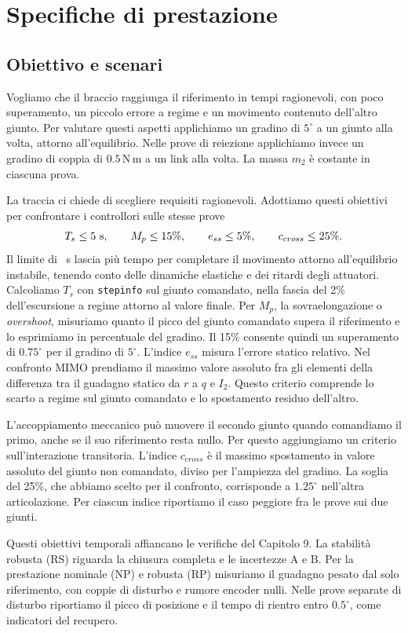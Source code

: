 \chapter{Specifiche di prestazione}
\section{Obiettivo e scenari}
Vogliamo che il braccio raggiunga il riferimento in tempi ragionevoli,
con poco superamento, un piccolo errore a regime e un movimento
contenuto dell'altro giunto. Per valutare questi aspetti applichiamo
un gradino di $5^\circ$ a un giunto alla volta, attorno all'equilibrio.
Nelle prove di reiezione applichiamo invece un gradino di coppia di
$0.5\,\mathrm{N\,m}$ a un link alla volta. La massa $m_2$ è costante
in ciascuna prova.

La traccia ci chiede di scegliere requisiti ragionevoli. Adottiamo
questi obiettivi per confrontare i controllori sulle stesse prove
\[
 T_s\leq5\ \mathrm{s},\qquad M_p\leq15\%,\qquad
 e_{ss}\leq5\%,\qquad c_{cross}\leq25\%.
\]
Il limite di \FinTsLimit\ s lascia più tempo per completare il
movimento attorno all'equilibrio instabile, tenendo conto delle
dinamiche elastiche e dei ritardi degli attuatori. Calcoliamo $T_s$ con \texttt{stepinfo} sul
giunto comandato, nella fascia del 2\% dell'escursione a regime attorno
al valore finale. Per $M_p$, la sovraelongazione o \emph{overshoot},
misuriamo quanto il picco del giunto comandato supera il riferimento
e lo esprimiamo in percentuale del gradino. Il 15\% consente quindi
un superamento di $0.75^\circ$ per il gradino di $5^\circ$.
L'indice $e_{ss}$ misura l'errore statico relativo. Nel confronto MIMO
prendiamo il massimo valore assoluto fra gli elementi della differenza
tra il guadagno statico da $r$ a $q$ e $I_2$. Questo criterio comprende
lo scarto a regime sul giunto comandato e lo spostamento residuo
dell'altro.

L'accoppiamento meccanico può muovere il secondo giunto quando
comandiamo il primo, anche se il suo riferimento resta nullo.
Per questo aggiungiamo un criterio sull'interazione transitoria.
L'indice $c_{cross}$ è il massimo spostamento in valore assoluto del
giunto non comandato, diviso per l'ampiezza del gradino. La soglia del 25\%, che abbiamo scelto per il confronto, corrisponde
a $1.25^\circ$ nell'altra articolazione. Per ciascun indice riportiamo
il caso peggiore fra le prove sui due giunti.

Questi obiettivi temporali affiancano le verifiche del Capitolo 9.
La stabilità robusta (RS) riguarda la chiusura completa e le
incertezze A e B. Per la prestazione nominale (NP) e robusta (RP)
misuriamo il guadagno pesato dal solo riferimento, con coppie di
disturbo e rumore encoder nulli. Nelle prove separate di disturbo
riportiamo il picco di posizione e il tempo di rientro entro
$0.5^\circ$, come indicatori del recupero.


